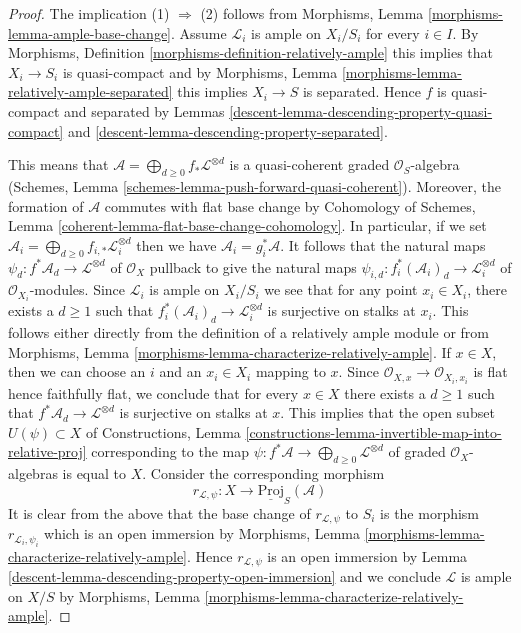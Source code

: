 \begin{proof}

The implication (1) $\Rightarrow$ (2) follows from
Morphisms, Lemma \ref{morphisms-lemma-ample-base-change}.
Assume $\mathcal{L}_i$ is ample on $X_i/S_i$ for every $i \in I$.
By Morphisms, Definition \ref{morphisms-definition-relatively-ample}
this implies that $X_i \to S_i$ is quasi-compact and by
Morphisms, Lemma \ref{morphisms-lemma-relatively-ample-separated}
this implies $X_i \to S$ is separated.
Hence $f$ is quasi-compact and separated by
Lemmas \ref{descent-lemma-descending-property-quasi-compact} and
\ref{descent-lemma-descending-property-separated}.

\medskip\noindent
This means that
$\mathcal{A} = \bigoplus_{d \geq 0} f_*\mathcal{L}^{\otimes d}$
is a quasi-coherent graded $\mathcal{O}_S$-algebra
(Schemes, Lemma \ref{schemes-lemma-push-forward-quasi-coherent}).
Moreover, the formation of $\mathcal{A}$ commutes with flat
base change by
Cohomology of Schemes, Lemma \ref{coherent-lemma-flat-base-change-cohomology}.
In particular, if we set
$\mathcal{A}_i = \bigoplus_{d \geq 0} f_{i, *}\mathcal{L}_i^{\otimes d}$
then we have $\mathcal{A}_i = g_i^*\mathcal{A}$.
It follows that the natural maps
$\psi_d : f^*\mathcal{A}_d \to \mathcal{L}^{\otimes d}$
of $\mathcal{O}_X$
pullback to give the natural maps
$\psi_{i, d} : f_i^*(\mathcal{A}_i)_d \to \mathcal{L}_i^{\otimes d}$
of $\mathcal{O}_{X_i}$-modules. Since $\mathcal{L}_i$ is ample on $X_i/S_i$
we see that for any point $x_i \in X_i$, there exists a $d \geq 1$
such that $f_i^*(\mathcal{A}_i)_d \to \mathcal{L}_i^{\otimes d}$
is surjective on stalks at $x_i$. This follows either directly
from the definition of a relatively ample module or from
Morphisms, Lemma \ref{morphisms-lemma-characterize-relatively-ample}.
If $x \in X$, then we can choose an $i$ and an $x_i \in X_i$
mapping to $x$. Since $\mathcal{O}_{X, x} \to \mathcal{O}_{X_i, x_i}$
is flat hence faithfully flat, we conclude that for every $x \in X$
there exists a $d \geq 1$ such that
$f^*\mathcal{A}_d \to \mathcal{L}^{\otimes d}$
is surjective on stalks at $x$.
This implies that the open subset $U(\psi) \subset X$ of
Constructions, Lemma
\ref{constructions-lemma-invertible-map-into-relative-proj}
corresponding to the map
$\psi : f^*\mathcal{A} \to \bigoplus_{d \geq 0} \mathcal{L}^{\otimes d}$
of graded $\mathcal{O}_X$-algebras
is equal to $X$. Consider the corresponding morphism
$$
r_{\mathcal{L}, \psi} : X \longrightarrow \underline{\text{Proj}}_S(\mathcal{A})
$$
It is clear from the above that the base change of
$r_{\mathcal{L}, \psi}$ to $S_i$ is the morphism
$r_{\mathcal{L}_i, \psi_i}$ which is an open immersion by
Morphisms, Lemma \ref{morphisms-lemma-characterize-relatively-ample}.
Hence $r_{\mathcal{L}, \psi}$ is an open immersion
by Lemma \ref{descent-lemma-descending-property-open-immersion}
and we conclude $\mathcal{L}$ is ample on $X/S$ by
Morphisms, Lemma \ref{morphisms-lemma-characterize-relatively-ample}.
\end{proof}

